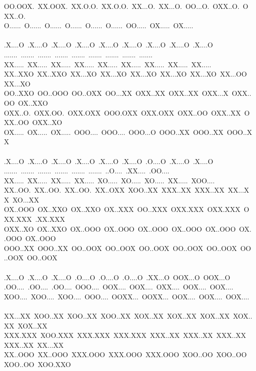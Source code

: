 \documentclass[12pt]{article}
\begin{document}
\begin{center}
{OO.OOX.~XX.OOX.~XX.O.O.~XX.O.O.~XX...O.~XX...O.~OO...O.~OXX..O.~OXX..O.~\\
O......~O......~O......~O......~O......~O......~OO.....~OX.....~OX.....~\\
~\\
.X....O~.X....O~.X....O~.X....O~.X....O~.X....O~.X....O~.X....O~.X....O~\\
.......~.......~.......~.......~.......~.......~.......~.......~.......~\\
XX.....~XX.....~XX.....~XX.....~XX.....~XX.....~XX.....~XX.....~XX.....~\\
XX..XXO~XX..XXO~XX...XO~XX...XO~XX...XO~XX...XO~XX...XO~XX...OO~XX...XO~\\
OO..XXO~OO..OOO~OO..OXX~OO...XX~OXX..XX~OXX..XX~OXX...X~OXX..OO~OX..XXO~\\
OXX..O.~OXX.OO.~OXX.OXX~OOO.OXX~OXX.OXX~OXX..OO~OXX..XX~OXX..OO~OXX..XO~\\
OX.....~OX.....~OX.....~OOO....~OOO....~OOO...O~OOO..XX~OOO..XX~OOO..XX~\\
~\\
.X....O~.X....O~.X....O~.X....O~.X....O~.X....O~.O....O~.X....O~.X....O~\\
.......~.......~.......~.......~.......~.......~..O....~.XX....~.OO....~\\
XX.....~XX.....~XX.....~XX.....~XO.....~XO.....~XO.....~XX.....~XOO....~\\
XX..OO.~XX..OO.~XX..OO.~XX..OXX~XOO..XX~XXX..XX~XXX..XX~XX...XX~XO...XX~\\
OX..OOO~OX..XXO~OX..XXO~OX..XXX~OO..XXX~OXX.XXX~OXX.XXX~OXX.XXX~.XX.XXX~\\
OXX..XO~OX..XXO~OX..OOO~OX..OOO~OX..OOO~OX..OOO~OX..OOO~OX..OOO~OX..OOO~\\
OOO..XX~OOO..XX~OO..OOX~OO..OOX~OO..OOX~OO..OOX~OO..OOX~OO..OOX~OO..OOX~\\
~\\
.X....O~.X....O~.X....O~.O....O~.O....O~.O....O~.XX...O~OOX...O~OOX...O~\\
.OO....~.OO....~.OO....~OOO....~OOX....~OOX....~OXX....~OOX....~OOX....~\\
XOO....~XOO....~XOO....~OOO....~OOXX...~OOXX...~OOX....~OOX....~OOX....~\\
XX...XX~XOO..XX~XOO..XX~XOO..XX~XOX..XX~XOX..XX~XOX..XX~XOX..XX~XOX..XX~\\
XXX.XXX~XOO.XXX~XXX.XXX~XXX.XXX~XXX..XX~XXX..XX~XXX..XX~XXX..XX~XX...XX~\\
XX..OOO~XX..OOO~XXX.OOO~XXX.OOO~XXX.OOO~XOO..OO~XOO..OO~XOO..OO~XOO.XXO~\\
}
\end{center}
\end{document}
